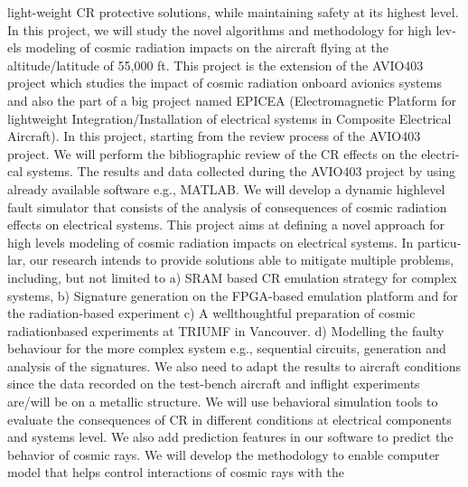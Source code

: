\begin{otherlanguage}{english}
light-weight CR protective solutions, while maintaining safety at its highest level. 
In   this   project,   we   will   study   the   novel   algorithms   and   methodology   for   high   levels   modeling   of   cosmic  
radiation   impacts   on   the   aircraft   flying   at   the   altitude/latitude   of   55,000   ft.   This   project   is   the   extension  
of   the   AVIO403   project   which   studies   the   impact   of   cosmic   radiation   on­board   avionics   systems   and  
also   the   part   of   a   big   project   named   EPICEA   (Electromagnetic   Platform   for   lightweight  
Integration/Installation   of   electrical   systems   in   Composite   Electrical   Aircraft).   In   this   project,   starting  
from   the   review   process   of   the   AVIO403   project.   We   will   perform   the   bibliographic   review   of   the   CR  
effects   on   the   electrical   systems.   The   results   and   data   collected   during   the   AVIO403   project   by   using  
already   available   software   e.g.,   MATLAB.   We   will   develop   a   dynamic   high­level   fault   simulator   that  
consists   of   the   analysis   of   consequences   of   cosmic   radiation   effects   on   electrical   systems.   This   project  
aims   at   defining   a   novel   approach   for   high   levels   modeling   of   cosmic   radiation   impacts   on   electrical  
systems.   In   particular,   our   research   intends   to   provide   solutions   able   to   mitigate   multiple   problems,  
including,   but   not   limited   to   a)   SRAM   based   CR   emulation   strategy   for   complex   systems, b) Signature generation on the FPGA-based emulation platform and for the radiation-based experiment c)   A  
well­thoughtful   preparation   of   cosmic   radiation­based   experiments   at   TRIUMF   in   Vancouver. d) Modelling the faulty behaviour for the more complex system e.g., sequential circuits, generation and analysis of the signatures.  We   also  
need   to   adapt   the   results   to   aircraft   conditions   since   the   data   recorded   on   the   test-bench   aircraft   and  
in­flight   experiments   are/will   be   on   a   metallic   structure.   We   will   use   behavioral   simulation   tools   to  
evaluate   the   consequences   of   CR   in   different   conditions   at   electrical   components   and   systems   level.  
We   also   add   prediction   features   in   our   software   to   predict   the   behavior   of   cosmic   rays.   We   will   develop  
the   methodology   to   enable   computer   model   that   helps   control   interactions   of   cosmic   rays   with   the  

\end{otherlanguage}
